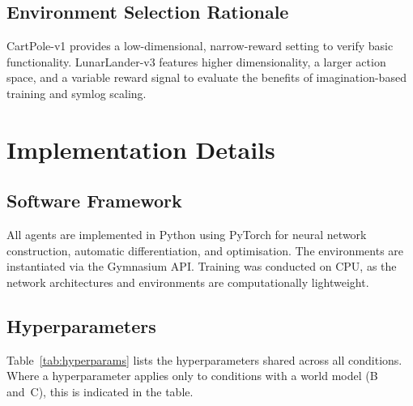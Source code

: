 \subsection{Environment Selection Rationale}
\label{subsec:method_env_rationale}

CartPole-v1 provides a low-dimensional, narrow-reward setting to verify basic functionality. LunarLander-v3 features higher dimensionality, a larger action space, and a variable reward signal to evaluate the benefits of imagination-based training and symlog scaling.

\section{Implementation Details}
\label{sec:method_impl}

\subsection{Software Framework}
\label{subsec:method_framework}

All agents are implemented in Python using PyTorch for
neural network construction, automatic differentiation, and optimisation. The
environments are instantiated via the Gymnasium API.
Training was conducted on CPU, as the network architectures and environments are computationally lightweight.

\subsection{Hyperparameters}
\label{subsec:method_hyperparams}

Table~\ref{tab:hyperparams} lists the hyperparameters shared across all conditions.
Where a hyperparameter applies only to conditions with a world model (B and~C),
this is indicated in the table.


